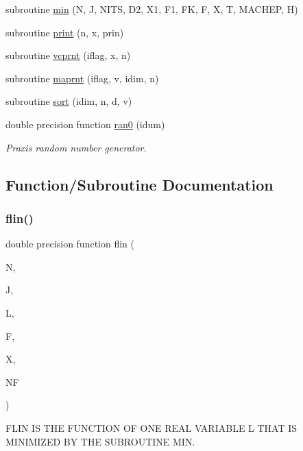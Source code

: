 \begin{DoxyCompactItemize}
subroutine \hyperlink{praxis_8f_ad17dd523e058957564e309fed67cfa20}{min} (N, J, N\+I\+TS, D2, X1, F1, FK, F, X, T, M\+A\+C\+H\+EP, H)
\item 
subroutine \hyperlink{praxis_8f_ac10ca39b9214d2a1ff4701ab237bf2a9}{print} (n, x, prin)
\item 
subroutine \hyperlink{praxis_8f_a45854e864f31f82eb39cae6a2882c883}{vcprnt} (iflag, x, n)
\item 
subroutine \hyperlink{praxis_8f_ac6663bade5f6b02f5bc8c05767d38027}{maprnt} (iflag, v, idim, n)
\item 
subroutine \hyperlink{praxis_8f_a462bf29e7634caebf340f472d7b13bd0}{sort} (idim, n, d, v)
\item 
double precision function \hyperlink{praxis_8f_af54b43bfee4d4da9d35c12de385dd6cd}{ran0} (idum)
\begin{DoxyCompactList}\small\item\em Praxis\textquotesingle{} random number generator. \end{DoxyCompactList}\end{DoxyCompactItemize}


\subsection{Function/\+Subroutine Documentation}
\mbox{\label{praxis_8f_a590128548b876bdd2e640b35ccee9515}} 
\subsubsection{\texorpdfstring{flin()}{flin()}}
{\footnotesize\ttfamily double precision function flin (\begin{DoxyParamCaption}\item[{}]{N,  }\item[{}]{J,  }\item[{real$\ast$8}]{L,  }\item[{external}]{F,  }\item[{real$\ast$8, dimension(n)}]{X,  }\item[{}]{NF }\end{DoxyParamCaption})}



F\+L\+IN IS T\+HE F\+U\+N\+C\+T\+I\+ON OF O\+NE R\+E\+AL V\+A\+R\+I\+A\+B\+LE L T\+H\+AT IS M\+I\+N\+I\+M\+I\+Z\+ED BY T\+HE S\+U\+B\+R\+O\+U\+T\+I\+NE M\+IN. 

